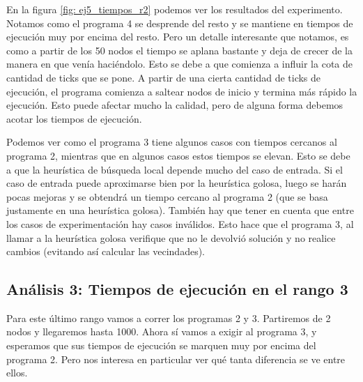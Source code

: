 \par En la figura \ref{fig: ej5_tiempos_r2} podemos ver los resultados del experimento. Notamos como el programa 4 se desprende del resto y se mantiene en tiempos de ejecución muy por encima del resto. Pero un detalle interesante que notamos, es como a partir de los 50 nodos el tiempo se aplana bastante y deja de crecer de la manera en que venía haciéndolo. Esto se debe a que comienza a influir la cota de cantidad de ticks que se pone. A partir de una cierta cantidad de ticks de ejecución, el programa comienza a saltear nodos de inicio y termina más rápido la ejecución. Esto puede afectar mucho la calidad, pero de alguna forma debemos acotar los tiempos de ejecución.

\par Podemos ver como el programa 3 tiene algunos casos con tiempos cercanos al programa 2, mientras que en algunos casos estos tiempos se elevan. Esto se debe a que la heurística de búsqueda local depende mucho del caso de entrada. Si el caso de entrada puede aproximarse bien por la heurística golosa, luego se harán pocas mejoras y se obtendrá un tiempo cercano al programa 2 (que se basa justamente en una heurística golosa). También hay que tener en cuenta que entre los casos de experimentación hay casos inválidos. Esto hace que el programa 3, al llamar a la heurística golosa verifique que no le devolvió solución y no realice cambios (evitando así calcular las vecindades).

\subsection{Análisis 3: Tiempos de ejecución en el rango 3}

\par Para este último rango vamos a correr los programas 2 y 3. Partiremos de 2 nodos y llegaremos hasta 1000. Ahora sí vamos a exigir al programa 3, y esperamos que sus tiempos de ejecución se marquen muy por encima del programa 2. Pero nos interesa en particular ver qué tanta diferencia se ve entre ellos.

